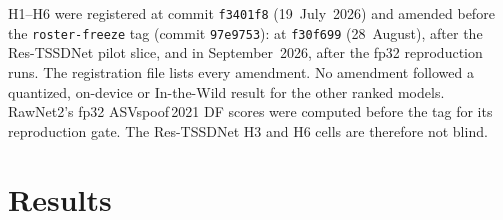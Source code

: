 \documentclass[journal]{IEEEtran}
\begin{document}
H1--H6 were registered at commit \texttt{f3401f8} (19~July~2026) and amended
before the \texttt{roster-freeze} tag (commit \texttt{97e9753}): at
\texttt{f30f699} (28~August), after the Res-TSSDNet pilot slice, and in
September~2026, after the fp32 reproduction runs. The registration file lists
every amendment. No amendment followed a quantized, on-device or In-the-Wild
result for the other ranked models. RawNet2's fp32 ASVspoof\,2021 DF scores were
computed before the tag for its reproduction gate. The Res-TSSDNet H3 and H6
cells are therefore not blind.

\section{Results}
\label{sec:results}
\end{document}
